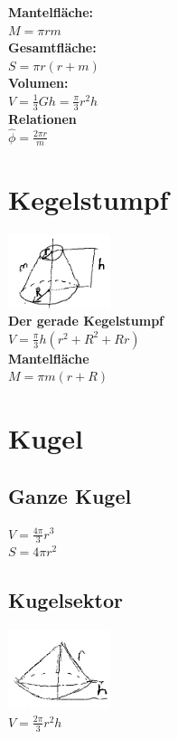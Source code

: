 \documentclass[10pt,a4paper]{article}
\begin{document}
\begin{multicols}{4}
		\textbf{Mantelfläche:}\\
		\(M = \pi rm \)\\
		\textbf{Gesamtfläche:}\\
		\(S = \pi r (r + m) \)\\
		\textbf{Volumen:}\\
		\(V=\frac{1}{3} G h = \frac{\pi}{3}r^2 h\)\\
		\textbf{Relationen}\\
		\( \widehat{\phi} = \frac{2\pi r}{m} \)
		
		\section{Kegelstumpf}
		\includegraphics[width=3cm]{imgs/kegs1}\\
		\textbf{Der gerade Kegelstumpf}\\
		\(V = \frac{\pi}{3}h (r^2 + R^2 + Rr) \)\\
		\textbf{Mantelfläche}\\
		\(M = \pi m (r + R) \)
		
		\section{Kugel}
		\subsection{Ganze Kugel}
		\( V = \frac{4\pi}{3}r^3 \)\\
		\( S = 4\pi r^2 \)
		
		\subsection{Kugelsektor}
		\includegraphics[width=3cm]{imgs/kugsek}\\
		\(V = \frac{2\pi}{3} r^2 h \)
		

\end{multicols}
\end{document}
